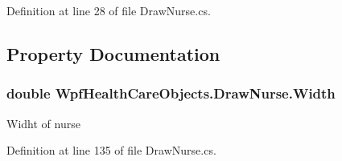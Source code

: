 Definition at line 28 of file Draw\+Nurse.\+cs.



\subsection{Property Documentation}
\subsubsection[{\texorpdfstring{Width}{Width}}]{\setlength{\rightskip}{0pt plus 5cm}double Wpf\+Health\+Care\+Objects.\+Draw\+Nurse.\+Width\hspace{0.3cm}{\ttfamily [get]}}\hypertarget{class_wpf_health_care_objects_1_1_draw_nurse_a8a916f75d3d93525ac2889a720b8004c}{}\label{class_wpf_health_care_objects_1_1_draw_nurse_a8a916f75d3d93525ac2889a720b8004c}


Widht of nurse 



Definition at line 135 of file Draw\+Nurse.\+cs.

